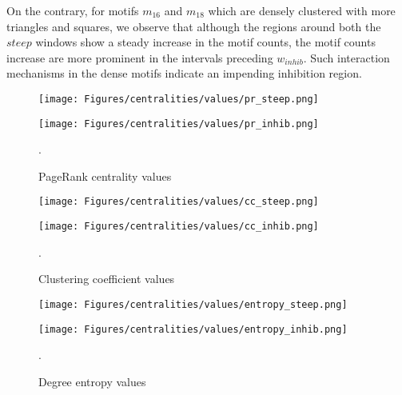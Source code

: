 \documentclass[smallextended]{svjour3}       %
\theoremstyle{definition}
\begin{document}
On the contrary, for motifs $m_{16}$ and $m_{18}$ which are densely clustered with more triangles and squares, we observe that although the regions around both the $steep$ windows show a steady increase in the motif counts, the motif counts increase are more prominent in the intervals preceding $w_{inhib}$. Such interaction mechanisms in the dense motifs indicate an impending inhibition region.

\begin{figure}[t]
	\centering
	\hfill
	\begin{minipage}{0.50\textwidth}%
		\texttt{[image: Figures/centralities/values/pr\_steep.png]}
		\hspace*{2cm}\subcaption{}
	\end{minipage}
	\hfill
	\begin{minipage}{0.40\textwidth}
		\texttt{[image: Figures/centralities/values/pr\_inhib.png]}
		\hspace*{2cm}\subcaption{}
	\end{minipage}
	\hfill
	\caption{PageRank centrality values}.
	\label{fig:pr} 
\end{figure}

\begin{figure}[]
	\centering
	\hfill
	\begin{minipage}{0.50\textwidth}%
		\texttt{[image: Figures/centralities/values/cc\_steep.png]}
		\hspace*{2cm}\subcaption{}
	\end{minipage}
	\hfill
	\begin{minipage}{0.40\textwidth}
		\texttt{[image: Figures/centralities/values/cc\_inhib.png]}
		\hspace*{2cm}\subcaption{}
	\end{minipage}

	\hfill
	\label{fig:cc}
	\caption{Clustering coefficient values}. 
\end{figure}

\begin{figure}[]
	\centering
	\hfill
	\begin{minipage}{0.50\textwidth}%
		\texttt{[image: Figures/centralities/values/entropy\_steep.png]}
		\hspace*{2cm}\subcaption{}
	\end{minipage}
	\hfill
	\begin{minipage}{0.40\textwidth}
		\texttt{[image: Figures/centralities/values/entropy\_inhib.png]}
		\hspace*{2cm}\subcaption{}
	\end{minipage}

	\hfill
	\label{fig:deg_ent}
	\caption{Degree entropy values}. 
\end{figure}
\end{document}

